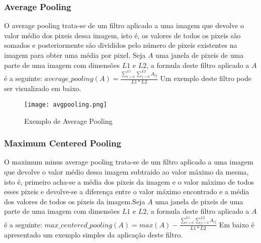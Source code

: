 \subsubsection{Average Pooling}\hfill\newline
  \hfill\newline
  O average pooling trata-se de um filtro aplicado a uma imagem que devolve o valor médio dos pixeis dessa imagem, isto é, os valores de todos os pixeis são somados e posteriormente são divididos pelo número de pixeis existentes na imagem para obter uma média por pixel\cite{ref8}. Seja $A$ uma janela de pixeis de uma parte de uma imagem com dimensões $L1$ e $L2$, a formula deste filtro aplicado a $A$ é a seguinte:\hfill\newline
  \hfill\newline
  $average\_pooling(A) = \frac{\sum_{i=0}^{L1}\sum_{j=0}^{L2} A_{ij}}{L1*L2}$
  \hfill\newline
  \hfill\newline
  Um exemplo deste filtro pode ser visualizado em baixo.

  \begin{figure}[H]

    \centering
    \captionsetup{justification=centering}

    \texttt{[image: avgpooling.png]}
    
    \caption {Exemplo de Average Pooling}

  \end{figure}


\subsubsection{Maximum Centered Pooling}\hfill\newline
  \hfill\newline
  O maximum minus average pooling trata-se de um filtro aplicado a uma imagem que devolve o valor médio dessa imagem subtraido ao valor máximo da mesma, isto é, primeiro acha-se a média dos pixeis da imagem e o valor máximo de todos esses pixeis e devolve-se a diferença entre o valor máximo encontrado e a média dos valores de todos os pixeis da imagem.Seja $A$ uma janela de pixeis de uma parte de uma imagem com dimensões $L1$ e $L2$, a formula deste filtro aplicado a $A$ é a seguinte:\hfill\newline
  \hfill\newline
  $max\_centered\_pooling(A) = max(A) - \frac{\sum_{i=0}^{L1}\sum_{j=0}^{L2} A_{ij}}{L1*L2}$
  \hfill\newline
  \hfill\newline
  Em baixo é apresentado um exemplo simples da aplicação deste filtro.

